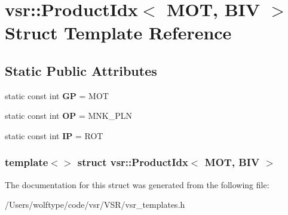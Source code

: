 \hypertarget{structvsr_1_1_product_idx_3_01_m_o_t_00_01_b_i_v_01_4}{\section{vsr\-:\-:Product\-Idx$<$ M\-O\-T, B\-I\-V $>$ Struct Template Reference}
\label{structvsr_1_1_product_idx_3_01_m_o_t_00_01_b_i_v_01_4}
}
\subsection*{Static Public Attributes}
\begin{DoxyCompactItemize}
\item 
\hypertarget{structvsr_1_1_product_idx_3_01_m_o_t_00_01_b_i_v_01_4_a6641c9a193e2e17624a0870c5810cfa7}{static const int {\bfseries G\-P} = M\-O\-T}\label{structvsr_1_1_product_idx_3_01_m_o_t_00_01_b_i_v_01_4_a6641c9a193e2e17624a0870c5810cfa7}

\item 
\hypertarget{structvsr_1_1_product_idx_3_01_m_o_t_00_01_b_i_v_01_4_a3b463acad5ef3e8de431ce265b1548cf}{static const int {\bfseries O\-P} = M\-N\-K\-\_\-\-P\-L\-N}\label{structvsr_1_1_product_idx_3_01_m_o_t_00_01_b_i_v_01_4_a3b463acad5ef3e8de431ce265b1548cf}

\item 
\hypertarget{structvsr_1_1_product_idx_3_01_m_o_t_00_01_b_i_v_01_4_ace49166070f2f13f2d4ecad73ec2fdf3}{static const int {\bfseries I\-P} = R\-O\-T}\label{structvsr_1_1_product_idx_3_01_m_o_t_00_01_b_i_v_01_4_ace49166070f2f13f2d4ecad73ec2fdf3}

\end{DoxyCompactItemize}
\subsubsection*{template$<$$>$ struct vsr\-::\-Product\-Idx$<$ M\-O\-T, B\-I\-V $>$}



The documentation for this struct was generated from the following file\-:\begin{DoxyCompactItemize}
\item 
/\-Users/wolftype/code/vsr/\-V\-S\-R/vsr\-\_\-templates.\-h\end{DoxyCompactItemize}
